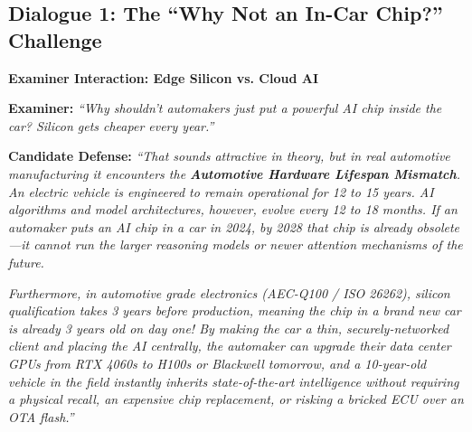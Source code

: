 \documentclass[12pt,a4paper]{report}
\newenvironment{dialoguebox}[1]{%
  \begin{mdframed}[backgroundcolor=cvislightbg,
    linecolor=cvisteal,linewidth=1.5pt,
    innerleftmargin=10pt,innerrightmargin=10pt,
    innertopmargin=6pt,innerbottommargin=6pt]
  \textbf{\color{cvisblue}#1}\par\smallskip}
  {\end{mdframed}}
\begin{document}
\subsection{Dialogue 1: The ``Why Not an In-Car Chip?'' Challenge}
\begin{dialoguebox}{Examiner Interaction: Edge Silicon vs. Cloud AI}
\textbf{Examiner:} \textit{``Why shouldn't automakers just put a powerful AI chip inside the car? Silicon gets cheaper every year.''}

\textbf{Candidate Defense:} 
\textit{``That sounds attractive in theory, but in real automotive manufacturing it encounters the \textbf{Automotive Hardware Lifespan Mismatch}. An electric vehicle is engineered to remain operational for 12 to 15 years. AI algorithms and model architectures, however, evolve every 12 to 18 months. If an automaker puts an AI chip in a car in 2024, by 2028 that chip is already obsolete---it cannot run the larger reasoning models or newer attention mechanisms of the future.}

\textit{Furthermore, in automotive grade electronics (AEC-Q100 / ISO 26262), silicon qualification takes 3 years before production, meaning the chip in a brand new car is already 3 years old on day one! By making the car a thin, securely-networked client and placing the AI centrally, the automaker can upgrade their data center GPUs from RTX 4060s to H100s or Blackwell tomorrow, and a 10-year-old vehicle in the field instantly inherits state-of-the-art intelligence without requiring a physical recall, an expensive chip replacement, or risking a bricked ECU over an OTA flash.''}
\end{dialoguebox}
\end{document}
